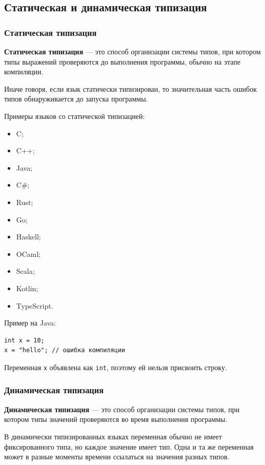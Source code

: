\documentclass[12pt,a4paper]{article}
\begin{document}
\subsection{Статическая и динамическая типизация}

\subsubsection{Статическая типизация}

\textbf{Статическая типизация} --- это способ организации системы типов, при котором
типы выражений проверяются до выполнения программы, обычно на этапе компиляции.

Иначе говоря, если язык статически типизирован, то значительная часть ошибок типов
обнаруживается до запуска программы.

Примеры языков со статической типизацией:

\begin{itemize}
    \item C;
    \item C++;
    \item Java;
    \item C\#;
    \item Rust;
    \item Go;
    \item Haskell;
    \item OCaml;
    \item Scala;
    \item Kotlin;
    \item TypeScript.
\end{itemize}

Пример на Java:

\begin{verbatim}
int x = 10;
x = "hello"; // ошибка компиляции
\end{verbatim}

Переменная \texttt{x} объявлена как \texttt{int}, поэтому ей нельзя присвоить строку.

\subsubsection{Динамическая типизация}

\textbf{Динамическая типизация} --- это способ организации системы типов, при котором
типы значений проверяются во время выполнения программы.

В динамически типизированных языках переменная обычно не имеет фиксированного типа,
но каждое значение имеет тип. Одна и та же переменная может в разные моменты времени
ссылаться на значения разных типов.
\end{document}
